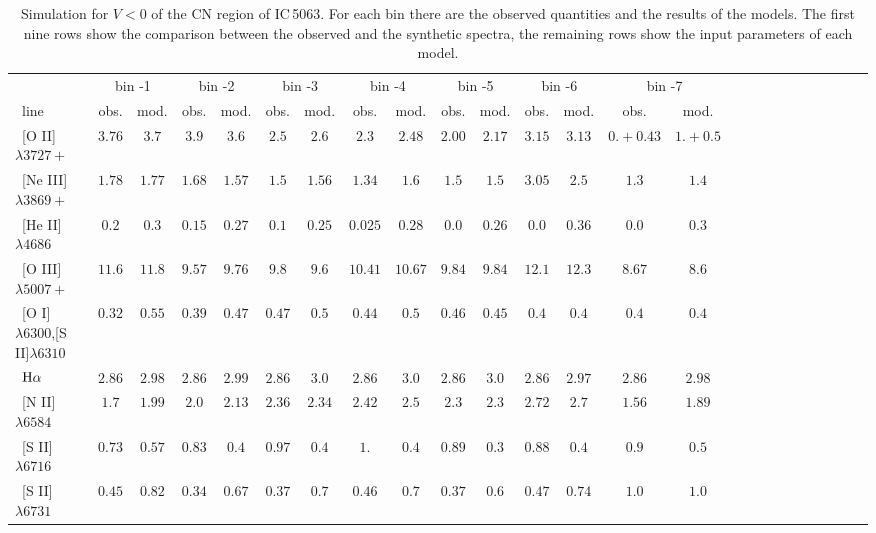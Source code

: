 \documentclass[../thesis.tex]{subfiles}
\begin{document}
\begin{landscape}
\begin{table}

\centering
\caption{Simulation for $V<0$ of the CN region of IC\,5063. For each bin there are the observed quantities and the results of the models. The first nine rows show the comparison between the observed and the synthetic spectra, the remaining rows show the input parameters of each model.}
\label{tab:sim_cn-}


\small{
\begin{tabular}{lcccccccccccccccccccccccc} 
\hline  
\  &\multicolumn{2}{c}{bin -1}&\multicolumn{2}{c}{bin -2}&\multicolumn{2}{c}{bin -3}&\multicolumn{2}{c}{bin -4}&\multicolumn{2}{c}{bin -5}&\multicolumn{2}{c}{bin -6}&\multicolumn{2}{c}{bin -7}\\
\   line                &obs.  & mod. &obs.&mod. &obs.  &mod. &obs.  &mod. &obs. &mod. &obs.&mod.&obs.&mod. \\ 
\hline
\ [O II]$\lambda3727+ $          &$3.76   $&$ 3.7  $&$3.9  $&$3.6   $&$2.5   $&$2.6   $&$2.3   $&$2.48  $&$2.00  $&$2.17 $&$3.15$&$3.13$&$0.+0.43$&$1.+0.5$\\
\ [Ne III]$\lambda3869+ $         &$1.78   $&$ 1.77 $&$1.68 $&$1.57  $&$1.5   $&$1.56  $&$1.34  $&$1.6   $&$1.5   $&$1.5$&$3.05$&$2.5$&$1.3$&$1.4   $\\
\ [He II]$\lambda4686$             &$0.2    $&$ 0.3  $&$0.15 $&$0.27  $&$0.1   $&$0.25  $&$0.025 $&$0.28  $&$0.0   $&$0.26$&$0.0$&$0.36$&$0.0$&$0.3 $\\
\ [O III]$\lambda5007+ $          &$11.6   $&$ 11.8 $&$9.57 $&$ 9.76 $&$ 9.8  $&$ 9.6  $&$10.41 $&$10.67 $&$ 9.84 $&$9.84$&$12.1$&$12.3$&$8.67$&$8.6$\\
\ [O I]$\lambda6300$,[S II]$\lambda6310$    &$0.32   $&$0.55  $&$0.39 $&$0.47  $&$0.47  $&$0.5   $&$0.44  $&$0.5   $&$0.46  $&$0.45$&$0.4  $&$0.4$&$0.4 $&$0.4  $ \\
\ $\rm H\alpha$                   &$2.86   $&$ 2.98 $&$2.86 $&$2.99  $&$2.86  $&$3.0   $&$2.86  $&$3.0   $&$2.86  $&$3.0 $&$2.86$&$2.97$&$2.86$&$2.98$ \\
\ [N II]$\lambda6584$             &$1.7    $&$ 1.99 $&$2.0  $&$2.13  $&$2.36  $&$2.34  $&$2.42  $&$2.5   $&$2.3   $&$2.3$&$2.72$&$2.7 $&$1.56$&$1.89 $\\
\ [S II]$\lambda6716$             &$0.73   $&$ 0.57 $&$0.83 $&$0.4   $&$0.97  $&$0.4   $&$1.    $&$0.4   $&$0.89  $&$0.3 $&$0.88$&$0.4$&$0.9 $&$0.5  $\\
\ [S II]$\lambda6731$              &$0.45   $&$ 0.82 $&$0.34 $&$0.67  $&$0.37  $&$0.7   $&$0.46  $&$0.7   $&$0.37  $&$0.6$&$0.47$&$0.74$&$1.0$&$1.0 $\\

\end{tabular}}
\end{table}
\end{landscape}
\end{document}
